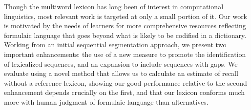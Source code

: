 Though the multiword lexicon has long been of interest in computational linguistics, most relevant work is targeted at only a small portion of it. Our work is motivated by the needs of learners for more comprehensive resources reflecting formulaic language that goes beyond what is likely to be codified in a dictionary. Working from an initial sequential segmentation approach, we present two important enhancements: the use of a new measure to promote the identification of lexicalized sequences, and an expansion to include sequences with gaps. We evaluate using a novel method that allows us to calculate an estimate of recall without a reference lexicon, showing our good performance relative to the second enhancement depends crucially on the first, and that our lexicon conforms much more with human judgment of formulaic language than alternatives.
